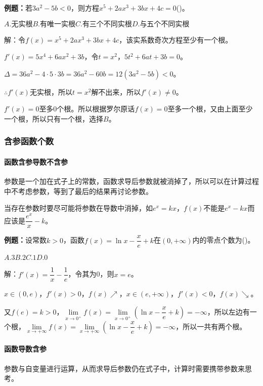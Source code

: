 \textbf{例题：}若$3a^2-5b<0$，则方程$x^5+2ax^3+3bx+4c=0$()。

$A.\text{无实根}$\qquad$B.\text{有唯一实根}$\qquad$C.\text{有三个不同实根}$\qquad$D.\text{与五个不同实根}$

解：令$f(x)=x^5+2ax^3+3bx+4c$，该实系数奇次方程至少有一个根。

$f'(x)=5x^4+6ax^2+3b$，令$t=x^2$，$5t^2+6at+3b=0$。

$\Delta=36a^2-4\cdot5\cdot3b=36a^2-60b=12(3a^2-5b)<0$。

$\therefore f'(x)$无实根，所以$t=x^2$解不出来，所以$f'(x)\neq0$。

$f'(x)=0$至多0个根。所以根据罗尔原话$f(x)=0$至多一个根，又由上面至少一个根，所以只有一个根，选择$B$。

\subsubsection{含参函数个数}

\paragraph{函数含参导数不含参} \leavevmode \medskip

参数是一个加在式子上的常数，函数求导后参数就被消掉了，所以可以在计算过程中不考虑参数，等到了最后的结果再讨论参数。

当存在参数时要尽可能将参数在导数中消掉，如$e^x=kx$，$f(x)$不能是$e^x-kx$而应该是$\dfrac{e^x}{x}-k$。

\textbf{例题：}设常数$k>0$，函数$f(x)=\ln x-\dfrac{x}{e}+k$在$(0,+\infty)$内的零点个数为()。

$A.3$\qquad$B.2$\qquad$C.1$\qquad$D.0$

解：$f'(x)=\dfrac{1}{x}-\dfrac{1}{e}$，令其为0，则$x=e$。

$x\in(0,e)$，$f'(x)>0$，$f(x)\nearrow$，$x\in(e,+\infty)$，$f'(x)<0$，$f(x)\searrow$。

又$f(e)=k>0$，$\lim\limits_{x\to0^+}f(x)=\lim\limits_{x\to0^+}(\ln x-\dfrac{x}{e}+k)=-\infty$，所以左边有一个根，$\lim\limits_{x\to+\infty}f(x)=\lim\limits_{x\to+\infty}(\ln x-\dfrac{x}{e}+k)=-\infty$，所以一共有两个根。

\paragraph{函数导数含参} \leavevmode \medskip

参数与自变量进行运算，从而求导后参数仍在式子中，计算时需要携带参数来思考。

